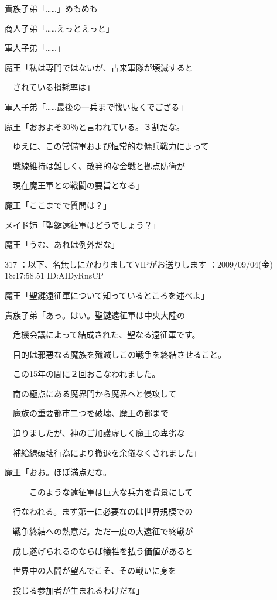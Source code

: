 \documentclass[a4j,twocolumn]{tarticle}
\begin{document}
貴族子弟「……」めもめも\par{} 
商人子弟「……えっとえっと」\par{} 
軍人子弟「……」 



魔王「私は専門ではないが、古来軍隊が壊滅すると\par{} 
　されている損耗率は」 



軍人子弟「……最後の一兵まで戦い抜くでござる」 



魔王「おおよそ30％と言われている。３割だな。\par{} 
　ゆえに、この常備軍および恒常的な傭兵戦力によって\par{} 
　戦線維持は難しく、散発的な会戦と拠点防衛が\par{} 
　現在魔王軍との戦闘の要旨となる」 



魔王「ここまでで質問は？」 



メイド姉「聖鍵遠征軍はどうでしょう？」 



魔王「うむ、あれは例外だな」 

	
    
    

317 ：以下、名無しにかわりましてVIPがお送りします ：2009/09/04(金) 18:17:58.51 ID:AIDyRnsCP 


魔王「聖鍵遠征軍について知っているところを述べよ」 



貴族子弟「あっ。はい。聖鍵遠征軍は中央大陸の\par{} 
　危機会議によって結成された、聖なる遠征軍です。\par{} 
　目的は邪悪なる魔族を殲滅しこの戦争を終結させること。\par{}
　この15年の間に２回おこなわれました。\par{} 
　南の極点にある魔界門から魔界へと侵攻して\par{} 
　魔族の重要都市二つを破壊、魔王の都まで\par{} 
　迫りましたが、神のご加護虚しく魔王の卑劣な\par{} 
　補給線破壊行為により撤退を余儀なくされました」 



魔王「おお。ほぼ満点だな。\par{} 
　――このような遠征軍は巨大な兵力を背景にして\par{} 
　行なわれる。まず第一に必要なのは世界規模での\par{} 
　戦争終結への熱意だ。ただ一度の大遠征で終戦が\par{} 
　成し遂げられるのならば犠牲を払う価値があると\par{} 
　世界中の人間が望んでこそ、その戦いに身を\par{} 
　投じる参加者が生まれるわけだな」 
\end{document}
